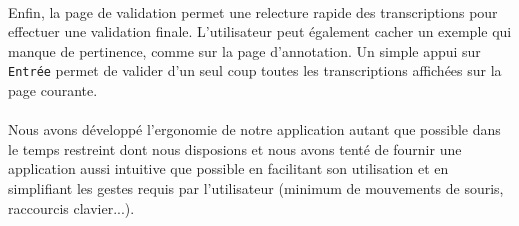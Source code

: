 \paragraph{}
Enfin, la page de validation permet une relecture rapide des transcriptions pour effectuer une validation finale. L'utilisateur peut également cacher un exemple qui manque de pertinence, comme sur la page d'annotation. Un simple appui sur \texttt{Entrée} permet de valider d'un seul coup toutes les transcriptions affichées sur la page courante.

\paragraph{}
Nous avons développé l'ergonomie de notre application autant que possible dans le temps restreint dont nous disposions et nous avons tenté de fournir une application aussi intuitive que possible en facilitant son utilisation et en simplifiant les gestes requis par l'utilisateur (minimum de mouvements de souris, raccourcis clavier...).

